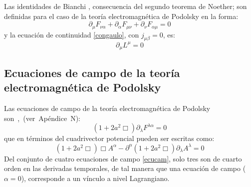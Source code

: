 \documentclass[a4paper,12pt]{article}
\begin{document}
Las identidades de Bianchi \cite{noether}, consecuencia del segundo teorema de Noether; son definidas para el caso de la teoría electromagnética de Podolsky en la forma:
\begin{equation}
\partial_\mu F_{\nu\alpha}+\partial_\alpha F_{\mu\nu}+\partial_\nu F_{\alpha\mu}=0 
\label{bianchi}
\end{equation}
y la ecuación de continuidad \eqref{congaulo}, con $j_{\mu\beta}=0$, es:
\begin{equation}
\partial_\mu L^\mu=0 
\label{conlogap}
\end{equation}
\subsection{Ecuaciones de campo de la teoría electromagnética de Podolsky}
Las ecuaciones de campo de la teoría electromagnética de Podolsky \mbox{son \cite{podolsky,forhaljdpo}, (ver Apéndice N):}
\begin{equation}
(1+2a^2\Box)\partial_{\lambda}F^{\lambda\alpha}=0
\label{lagpodol}
\end{equation}
que en términos del cuadrivector potencial pueden ser escritas como:
\begin{equation}
(1+2a^2\Box)\Box A^\alpha-\partial^\alpha(1+2a^2\Box)\partial_\lambda A^\lambda=0
\label{ecucam}
\end{equation}
Del conjunto de cuatro ecuaciones de campo \eqref{ecucam}, solo tres son de cuarto orden en las derivadas temporales, de tal manera que una ecuación de campo ($\alpha=0$), corresponde a un vínculo a nivel Lagrangiano.
\\
\end{document}
